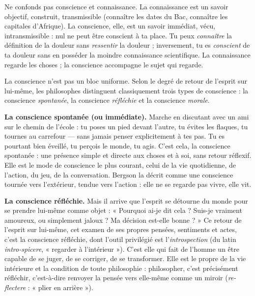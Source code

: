 \documentclass[11pt]{article}
\newcommand{\cle}[1]{{\popxbold\color{popdark}#1}}
\newcounter{popsec}
\newcounter{popsub}
\newcommand{\courssub}[1]{%
  \stepcounter{popsub}%
  \par\vspace{9pt}\noindent{\popxbold\fontsize{11.5}{13}\selectfont\color{popink}{\color{poporange}\thepopsec.\thepopsub}\hspace{6pt}#1}\par\nopagebreak\vspace{4pt}
}
\begin{document}
\begin{attention}
Ne confonds pas \cle{conscience} et \cle{connaissance}. La connaissance est un savoir objectif, construit, transmissible (connaître les dates du Bac, connaître les capitales d'Afrique). La conscience, elle, est un savoir immédiat, vécu, intransmissible : nul ne peut être conscient à ta place. Tu peux \emph{connaître} la définition de la douleur sans \emph{ressentir} la douleur ; inversement, tu es \emph{conscient} de ta douleur sans en posséder la moindre connaissance scientifique. La connaissance regarde les choses ; la conscience accompagne le sujet qui regarde.
\end{attention}

\courssub{Les trois types de conscience}

La conscience n'est pas un bloc uniforme. Selon le degré de retour de l'esprit sur lui-même, les philosophes distinguent classiquement trois types de conscience : la conscience \emph{spontanée}, la conscience \emph{réfléchie} et la conscience \emph{morale}.

\textbf{La conscience spontanée (ou immédiate).} Marche en discutant avec un ami sur le chemin de l'école : tu poses un pied devant l'autre, tu évites les flaques, tu tournes au carrefour — sans jamais penser explicitement à tes pas. Tu es pourtant bien éveillé, tu perçois le monde, tu agis. C'est cela, la conscience spontanée : une présence simple et directe aux choses et à soi, sans retour réflexif. Elle est le mode de conscience le plus courant, celui de la vie quotidienne, de l'action, du jeu, de la conversation. Bergson la décrit comme une conscience tournée vers l'extérieur, tendue vers l'action : elle ne se regarde pas vivre, elle vit.

\textbf{La conscience réfléchie.} Mais il arrive que l'esprit se détourne du monde pour se prendre lui-même comme objet : « Pourquoi ai-je dit cela ? Suis-je vraiment amoureux, ou simplement jaloux ? Ma décision est-elle bonne ? » Ce retour de l'esprit sur lui-même, cet examen de ses propres pensées, sentiments et actes, c'est la conscience réfléchie, dont l'outil privilégié est l'\emph{introspection} (du latin \emph{intro-spicere}, « regarder à l'intérieur »). C'est elle qui fait de l'homme un être capable de se juger, de se corriger, de se transformer. Elle est le propre de la vie intérieure et la condition de toute philosophie : philosopher, c'est précisément réfléchir, c'est-à-dire renvoyer la pensée vers elle-même comme un miroir (\emph{re-flectere} : « plier en arrière »).
\end{document}
